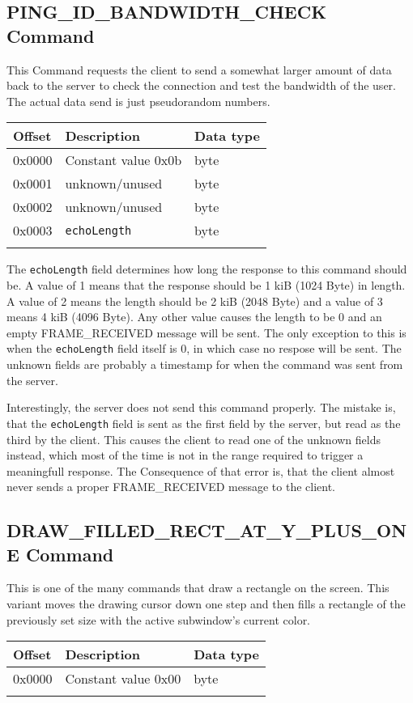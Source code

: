 \documentclass{article}
\newcommand{\field}[1]{\textcolor{fieldColor}{\texttt{#1}}}
\newenvironment{bytelisting}
{\ttfamily \begin{center} \begin{tabular}{l l l} Offset & Description & Data type \\ \hline}
{\normalfont \end{tabular} \end{center}}
\begin{document}
\subsection{PING\_ID\_BANDWIDTH\_CHECK Command}
This Command requests the client to send a somewhat larger amount of data back to the server to check the connection and test the bandwidth of the user. The actual data send is just 
pseudorandom numbers.

\begin{bytelisting}
0x0000 & Constant value 0x0b & byte \\
0x0001 & unknown/unused & byte \\
0x0002 & unknown/unused & byte \\
0x0003 & \field{echoLength} & byte \\
\end{bytelisting}

The \field{echoLength} field determines how long the response to this command should be. A value of 1 means that the response should be 1 kiB (1024 Byte) in length. A
value of 2 means the length should be 2 kiB (2048 Byte) and a value of 3 means 4 kiB (4096 Byte). Any other value causes the length to be 0 and an empty FRAME\_RECEIVED message will be sent.
The only exception to this is when the \field{echoLength} field itself is 0, in which case no respose will be sent.
The unknown fields are probably a timestamp for when the command was sent from the server.

Interestingly, the server does not send this command properly. The mistake is, that the \field{echoLength} field is sent as the first field by the server, but read as the third by the client. This causes the client to
read one of the unknown fields instead, which most of the time is not in the range required to trigger a meaningfull response. The Consequence of that error is, that the client almost never sends a proper
FRAME\_RECEIVED message to the client.

\subsection{DRAW\_FILLED\_RECT\_AT\_Y\_PLUS\_ONE Command}
This is one of the many commands that draw a rectangle on the screen. This variant moves the drawing cursor down one step and then fills a rectangle of the previously set size with the active subwindow's 
current color.

\begin{bytelisting}
0x0000 & Constant value 0x00 & byte \\
\end{bytelisting}
\end{document}
